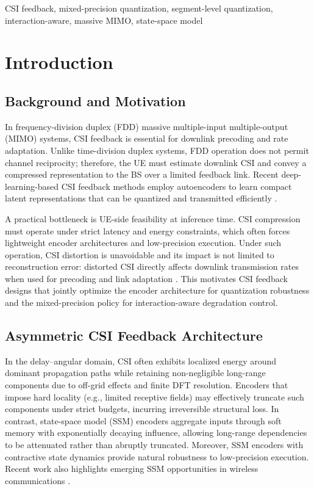 \documentclass[conference]{IEEEtran}
\begin{document}
\begin{IEEEkeywords}
CSI feedback, mixed-precision quantization, segment-level quantization, interaction-aware, massive MIMO, state-space model
\end{IEEEkeywords}

\section{Introduction}

\subsection{Background and Motivation}
In frequency-division duplex (FDD) massive multiple-input multiple-output (MIMO) systems, CSI feedback is essential for downlink precoding and rate adaptation. Unlike time-division duplex systems, FDD operation does not permit channel reciprocity; therefore, the UE must estimate downlink CSI and convey a compressed representation to the BS over a limited feedback link. Recent deep-learning-based CSI feedback methods employ autoencoders to learn compact latent representations that can be quantized and transmitted efficiently \cite{CsiNet,CsiNetPlus,CRNet,CLNet,TransNet,ACCsiNet}.

A practical bottleneck is UE-side feasibility at inference time. CSI compression must operate under strict latency and energy constraints, which often forces lightweight encoder architectures and low-precision execution. Under such operation, CSI distortion is unavoidable and its impact is not limited to reconstruction error: distorted CSI directly affects downlink transmission rates when used for precoding and link adaptation \cite{Jindal2006}. This motivates CSI feedback designs that jointly optimize the encoder architecture for quantization robustness and the mixed-precision policy for interaction-aware degradation control.

\subsection{Asymmetric CSI Feedback Architecture}
In the delay--angular domain, CSI often exhibits localized energy around dominant propagation paths while retaining non-negligible long-range components due to off-grid effects and finite DFT resolution. Encoders that impose hard locality (e.g., limited receptive fields) may effectively truncate such components under strict budgets, incurring irreversible structural loss. In contrast, state-space model (SSM) encoders aggregate inputs through soft memory with exponentially decaying influence, allowing long-range dependencies to be attenuated rather than abruptly truncated. Moreover, SSM encoders with contractive state dynamics provide natural robustness to low-precision execution. Recent work also highlights emerging SSM opportunities in wireless communications \cite{Mamba,MambaWireless}.
\end{document}
